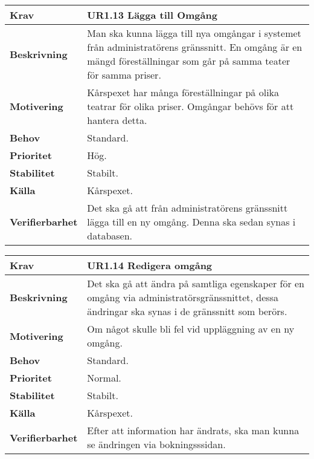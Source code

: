 \documentclass[a4paper, twoside, 11pt, titlepage]{article}
\begin{document}
		\begin{tabular} { p{2.6cm} p{12.5cm} }
			\hline
			\sffamily\textbf{Krav} & \sffamily\textbf{UR1.13 Lägga till Omgång  } \\
			\hline
			\sffamily\textbf{Beskrivning} & Man ska kunna lägga till nya omgångar i systemet från administratörens gränssnitt. En omgång är en mängd föreställningar som går på samma teater för samma priser.  \\
			\hline
			\sffamily\textbf{Motivering} & Kårspexet har många föreställningar på olika teatrar för olika priser. Omgångar behövs för att hantera detta.  \\
			\hline
			\sffamily\textbf{Behov} & Standard.  \\
			\hline
			\sffamily\textbf{Prioritet} & Hög.  \\
			\hline
			\sffamily\textbf{Stabilitet} & Stabilt.  \\
			\hline
			\sffamily\textbf{Källa} & Kårspexet.  \\
			\hline
			\sffamily\textbf{Verifierbarhet} & Det ska gå att från administratörens gränssnitt lägga till en ny omgång. Denna ska sedan synas i databasen.  \\
			\hline
		\end{tabular}
		\vspace{6mm}

		\begin{tabular} { p{2.6cm} p{12.5cm} }
			\hline
			\sffamily\textbf{Krav} & \sffamily\textbf{UR1.14 Redigera omgång  } \\
			\hline
			\sffamily\textbf{Beskrivning} & Det ska gå att ändra på samtliga egenskaper för en omgång via administratörsgränssnittet, dessa ändringar ska synas i de gränssnitt som berörs.  \\
			\hline
			\sffamily\textbf{Motivering} & Om något skulle bli fel vid uppläggning av en ny omgång.  \\
			\hline
			\sffamily\textbf{Behov} & Standard.  \\
			\hline
			\sffamily\textbf{Prioritet} & Normal.  \\
			\hline
			\sffamily\textbf{Stabilitet} & Stabilt.  \\
			\hline
			\sffamily\textbf{Källa} & Kårspexet.  \\
			\hline
			\sffamily\textbf{Verifierbarhet} & Efter att information har ändrats, ska man kunna se ändringen via bokningsssidan.  \\
			\hline
		\end{tabular}
\end{document}
